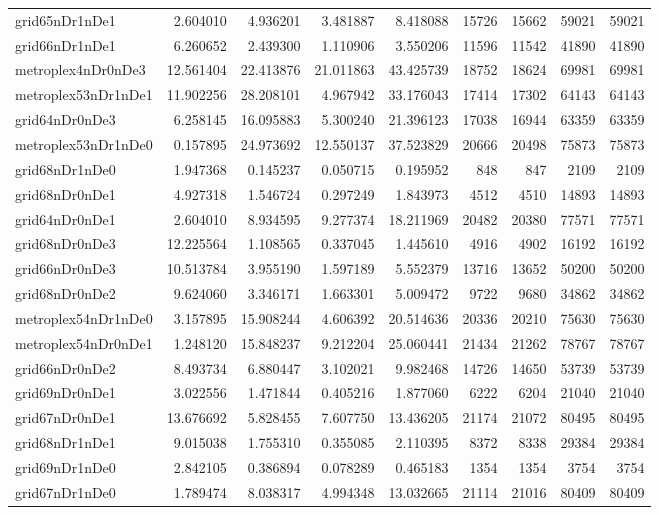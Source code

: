 \begin{longtable}{|l|r|r|r|r|r|r|r|r|}
grid65nDr1nDe1 & 2.604010 & 4.936201 & 3.481887 & 8.418088 & 15726 & 15662 & 59021 & 59021 \\
grid66nDr1nDe1 & 6.260652 & 2.439300 & 1.110906 & 3.550206 & 11596 & 11542 & 41890 & 41890 \\
metroplex4nDr0nDe3 & 12.561404 & 22.413876 & 21.011863 & 43.425739 & 18752 & 18624 & 69981 & 69981 \\
metroplex53nDr1nDe1 & 11.902256 & 28.208101 & 4.967942 & 33.176043 & 17414 & 17302 & 64143 & 64143 \\
grid64nDr0nDe3 & 6.258145 & 16.095883 & 5.300240 & 21.396123 & 17038 & 16944 & 63359 & 63359 \\
metroplex53nDr1nDe0 & 0.157895 & 24.973692 & 12.550137 & 37.523829 & 20666 & 20498 & 75873 & 75873 \\
grid68nDr1nDe0 & 1.947368 & 0.145237 & 0.050715 & 0.195952 & 848 & 847 & 2109 & 2109 \\
grid68nDr0nDe1 & 4.927318 & 1.546724 & 0.297249 & 1.843973 & 4512 & 4510 & 14893 & 14893 \\
grid64nDr0nDe1 & 2.604010 & 8.934595 & 9.277374 & 18.211969 & 20482 & 20380 & 77571 & 77571 \\
grid68nDr0nDe3 & 12.225564 & 1.108565 & 0.337045 & 1.445610 & 4916 & 4902 & 16192 & 16192 \\
grid66nDr0nDe3 & 10.513784 & 3.955190 & 1.597189 & 5.552379 & 13716 & 13652 & 50200 & 50200 \\
grid68nDr0nDe2 & 9.624060 & 3.346171 & 1.663301 & 5.009472 & 9722 & 9680 & 34862 & 34862 \\
metroplex54nDr1nDe0 & 3.157895 & 15.908244 & 4.606392 & 20.514636 & 20336 & 20210 & 75630 & 75630 \\
metroplex54nDr0nDe1 & 1.248120 & 15.848237 & 9.212204 & 25.060441 & 21434 & 21262 & 78767 & 78767 \\
grid66nDr0nDe2 & 8.493734 & 6.880447 & 3.102021 & 9.982468 & 14726 & 14650 & 53739 & 53739 \\
grid69nDr0nDe1 & 3.022556 & 1.471844 & 0.405216 & 1.877060 & 6222 & 6204 & 21040 & 21040 \\
grid67nDr0nDe1 & 13.676692 & 5.828455 & 7.607750 & 13.436205 & 21174 & 21072 & 80495 & 80495 \\
grid68nDr1nDe1 & 9.015038 & 1.755310 & 0.355085 & 2.110395 & 8372 & 8338 & 29384 & 29384 \\
grid69nDr1nDe0 & 2.842105 & 0.386894 & 0.078289 & 0.465183 & 1354 & 1354 & 3754 & 3754 \\
grid67nDr1nDe0 & 1.789474 & 8.038317 & 4.994348 & 13.032665 & 21114 & 21016 & 80409 & 80409 \\

\end{longtable}
